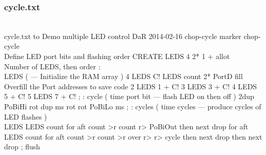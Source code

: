 \documentclass[10pt,english]{article}
\begin{document}
\subsubsection{cycle.txt}

\nwenddocs{}\endmoddef
\\ cycle.txt to Demo multiple LED control      DaR 2014-02-16
chop-cycle
marker chop-cycle
\\ Define LED port bits and flashing order
CREATE LEDS   4 2* 1 + allot \\ Number of LEDS, then order
: \\LEDS ( --- Initialize the RAM array )   4 LEDS C!
   LEDS count 2* PortD fill \\ Overfill the Port addresses to save code
   2 LEDS 1 + C!  3 LEDS 3 + C!  4 LEDS 5 + C!  5 LEDS 7 + C! ;
: cycle ( time port bit --- flash LED on then off )
   2dup PoBiHi  rot dup ms  rot rot PoBiLo  ms ;
: cycles ( time cycles --- produce cycles of LED flashes )   \\LEDS
   LEDS count for aft  count >r count r> PoBiOut  then next drop
   for aft  LEDS count for aft  count >r count >r over r> r>
         cycle  then next  drop  then next  drop ;
flush
\nwendcode{}\nwdocspar
\end{document}
